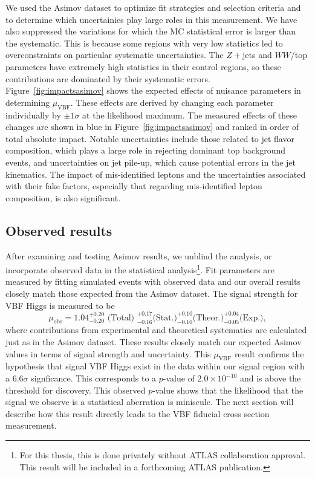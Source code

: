 We used the Asimov dataset to optimize fit strategies and selection criteria and to determine which uncertainies play large roles in this measurement. We have also suppressed the variations for which the MC statistical error is larger than the systematic. This is because some regions with very low statistics led to overconstraints on particular systematic uncertainties. The $Z+$jets and $WW$/top parameters have extremely high statistics in their control regions, so these contributions are dominated by their systematic errors. Figure~\ref{fig:impactsasimov} shows the expected effects of nuisance parameters in determining $\mu_{\text{VBF}}$. These effects are derived by changing each parameter individually by $\pm 1\sigma$ at the likelihood maximum. The measured effects of these changes are shown in blue in Figure~\ref{fig:impactsasimov} and ranked in order of total absolute impact. Notable uncertainties include those related to jet flavor composition, which plays a large role in rejecting dominant top background events, and uncertainties on jet pile-up, which cause potential errors in the jet kinematics. The impact of mis-identified leptons and the uncertainties associated with their fake factors, especially that regarding mis-identified lepton composition, is also significant.

\subsection{Observed results}
After examining and testing Asimov results, we unblind the analysis, or incorporate observed data in the statistical analysis\footnote{For this thesis, this is done privately without ATLAS collaboration approval. This result will be included in a forthcoming ATLAS publication.}. Fit parameters are measured by fitting simulated events with observed data and our overall results closely match those expected from the Asimov dataset. The signal strength for VBF Higgs is measured to be
\begin{equation}
\mu_{\text{obs}} = 1.04 ^{+0.20}_{-0.20} \text{ (Total) } ^{+0.17}_{-0.16} \text{(Stat.)} ^{+0.10}_{-0.10} \text{(Theor.)} ^{+0.04}_{-0.05} \text{(Exp.)},
\end{equation}
where contributions from experimental and theoretical systematics are  calculated just as in the Asimov dataset. These results closely match our expected Asimov values in terms of signal strength and uncertainty. This $\mu_\text{VBF}$ result confirms the hypothesis that signal VBF Higgs exist in the data within our signal region with a 6.6$\sigma$ signficance. This corresponds to a $p$-value of $2.0\times10^{-10}$ and is above the threshold for discovery. This observed $p$-value shows that the likelihood that the signal we observe is a statistical aberration is miniscule. The next section will describe how this result directly leads to the VBF fiducial cross section measurement. 

